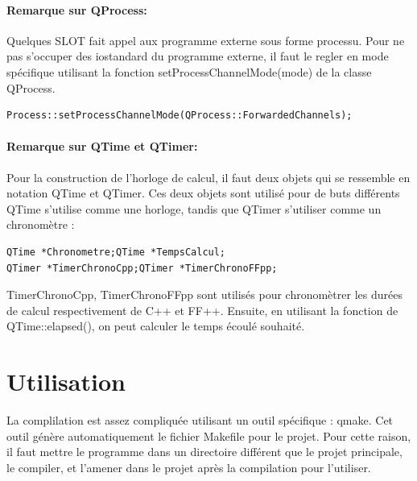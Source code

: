 \documentclass{book}
\begin{document}
\paragraph{Remarque sur QProcess:}
Quelques SLOT fait appel aux programme externe sous forme processu. Pour ne pas s'occuper des iostandard du programme externe, il faut le regler en mode spécifique utilisant la fonction setProcessChannelMode(mode) de la classe QProcess.
\begin{lstlisting}
Process::setProcessChannelMode(QProcess::ForwardedChannels);
\end{lstlisting}
\paragraph{Remarque sur QTime et QTimer:}
Pour la construction de l'horloge de calcul, il faut deux objets qui se ressemble en notation QTime et QTimer. Ces deux objets sont utilisé pour de buts différents QTime s'utilise comme une horloge, tandis que QTimer s'utiliser comme un chronomètre :
\begin{lstlisting}
QTime *Chronometre;QTime *TempsCalcul;
QTimer *TimerChronoCpp;QTimer *TimerChronoFFpp;
\end{lstlisting}
TimerChronoCpp, TimerChronoFFpp sont utilisés pour chronomètrer les durées de calcul respectivement de C++ et FF++. Ensuite, en utilisant la fonction de QTime::elapsed(), on peut calculer le temps écoulé souhaité.

\section{Utilisation}
La complilation est assez compliquée utilisant un outil spécifique : qmake. Cet outil génère automatiquement le fichier Makefile pour le projet. Pour cette raison, il faut mettre le programme dans un directoire différent que le projet principale, le compiler, et l'amener dans le projet après la compilation pour l'utiliser. 






\nocite{*}
\end{document}

